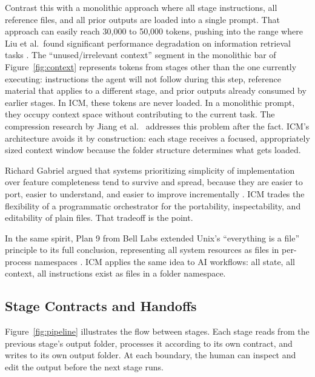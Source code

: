 \documentclass[acmlarge,nonacm,screen]{acmart}
\begin{document}
Contrast this with a monolithic approach where all stage instructions, all reference files, and all prior outputs are loaded into a single prompt. That approach can easily reach 30,000 to 50,000 tokens, pushing into the range where Liu et al.\ found significant performance degradation on information retrieval tasks \cite{liu2024}. The ``unused/irrelevant context'' segment in the monolithic bar of Figure~\ref{fig:context} represents tokens from stages other than the one currently executing: instructions the agent will not follow during this step, reference material that applies to a different stage, and prior outputs already consumed by earlier stages. In ICM, these tokens are never loaded. In a monolithic prompt, they occupy context space without contributing to the current task. The compression research by Jiang et al.\ \cite{jiang2023, jiang2024} addresses this problem after the fact. ICM's architecture avoids it by construction: each stage receives a focused, appropriately sized context window because the folder structure determines what gets loaded.

Richard Gabriel argued that systems prioritizing simplicity of implementation over feature completeness tend to survive and spread, because they are easier to port, easier to understand, and easier to improve incrementally \cite{gabriel1991}. ICM trades the flexibility of a programmatic orchestrator for the portability, inspectability, and editability of plain files. That tradeoff is the point.

In the same spirit, Plan 9 from Bell Labs extended Unix's ``everything is a file'' principle to its full conclusion, representing all system resources as files in per-process namespaces \cite{pike1995}. ICM applies the same idea to AI workflows: all state, all context, all instructions exist as files in a folder namespace.

\subsection{Stage Contracts and Handoffs}

Figure~\ref{fig:pipeline} illustrates the flow between stages. Each stage reads from the previous stage's output folder, processes it according to its own contract, and writes to its own output folder. At each boundary, the human can inspect and edit the output before the next stage runs.
\end{document}
